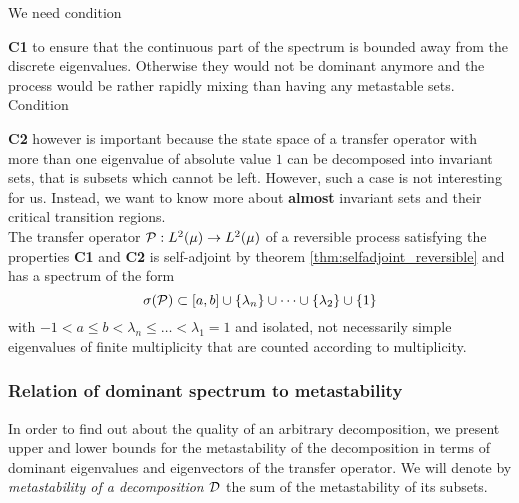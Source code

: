 We need condition {\textbf{\textsf{C1}} to ensure that the continuous part of the spectrum is bounded away from the discrete eigenvalues. Otherwise they would not be dominant anymore and the process would be rather rapidly mixing than having any metastable sets.
Condition {\textbf{\textsf{C2}} however is important because the state space of a transfer operator with more than one eigenvalue of absolute value $1$ can be decomposed into invariant sets, that is subsets which cannot be left. 
However, such a case is not interesting for us.
Instead, we want to know more about \textbf{almost} invariant sets and their critical transition regions. 
\\


The transfer operator $\mathcal{P}: L^2(\mu) \rightarrow L^2(\mu)$ of a reversible process satisfying the properties \textrm{\textbf{\textsf{C1}}} and \textrm{\textbf{\textsf{C2}}} is self-adjoint by theorem \ref{thm:selfadjoint_reversible} and has a spectrum of the form
\begin{equation*}
\sigma(\mathcal{P}) \subset [a,b] \cup \{\lambda_n\} \cup \dots \cup \{\lambda_2 \} \cup \{1\}
\end{equation*}
with $-1 < a \leq b < \lambda_n \leq \dots < \lambda_1 = 1$ and isolated, not necessarily simple eigenvalues of finite multiplicity that are counted according to multiplicity.


\subsubsection*{Relation of dominant spectrum to metastability}

In order to find out about the quality of an arbitrary decomposition, we present upper and lower bounds for the metastability of the decomposition in terms of dominant eigenvalues and eigenvectors of the transfer operator.
We will denote by \textit{metastability of a decomposition $\mathcal{D}$} the sum of the metastability of its subsets.

}}
